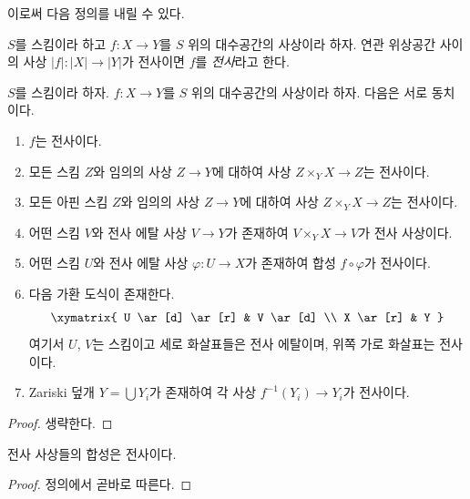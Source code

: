 \noindent
이로써 다음 정의를 내릴 수 있다.

\begin{definition}
\label{definition-surjective}
$S$를 스킴이라 하고 $f : X \to Y$를 $S$ 위의 대수공간의 사상이라 하자.
연관 위상공간 사이의 사상 $|f| : |X| \to |Y|$가 전사이면
$f$를 {\it 전사}라고 한다.
\end{definition}

\begin{lemma}
\label{lemma-surjective-local}
$S$를 스킴이라 하자.
$f : X \to Y$를 $S$ 위의 대수공간의 사상이라 하자.
다음은 서로 동치이다.
\begin{enumerate}
\item $f$는 전사이다.
\item 모든 스킴 $Z$와 임의의 사상 $Z \to Y$에 대하여
사상 $Z \times_Y X \to Z$는 전사이다.
\item 모든 아핀 스킴 $Z$와 임의의 사상 $Z \to Y$에 대하여
사상 $Z \times_Y X \to Z$는 전사이다.
\item 어떤 스킴 $V$와 전사 에탈 사상 $V \to Y$가 존재하여
$V \times_Y X \to V$가 전사 사상이다.
\item 어떤 스킴 $U$와 전사 에탈 사상 $\varphi : U \to X$가 존재하여
합성 $f \circ \varphi$가 전사이다.
\item 다음 가환 도식이 존재한다.
$$
\xymatrix{
U \ar[d] \ar[r] & V \ar[d] \\
X \ar[r] & Y
}
$$
여기서 $U$, $V$는 스킴이고 세로 화살표들은 전사 에탈이며,
위쪽 가로 화살표는 전사이다.
\item Zariski 덮개 $Y = \bigcup Y_i$가 존재하여 각 사상
$f^{-1}(Y_i) \to Y_i$가 전사이다.
\end{enumerate}
\end{lemma}

\begin{proof}
생략한다.
\end{proof}

\begin{lemma}
\label{lemma-composition-surjective}
전사 사상들의 합성은 전사이다.
\end{lemma}

\begin{proof}
정의에서 곧바로 따른다.
\end{proof}















